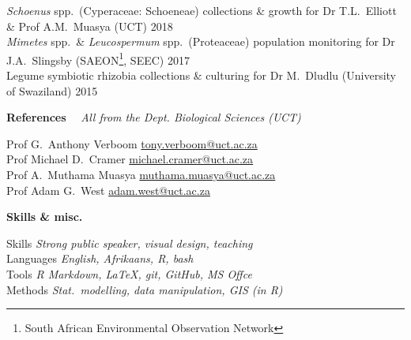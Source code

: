 \documentclass[10pt]{article}
\begin{document}
\textit{Schoenus} spp.~(Cyperaceae: Schoeneae)
  collections \& growth for
  Dr T.L.~Elliott \&
  Prof A.M.~Muasya {\small (UCT)}                                  \hfill {\small 2018} \\
\textit{Mimetes} spp.~\&
  \textit{Leucospermum} spp.~(Proteaceae) population
  monitoring for Dr J.A.~Slingsby
  {\small (SAEON\footnote{South African Environmental
  Observation Network}, SEEC)}                           \hfill {\small 2017} \\
Legume symbiotic rhizobia collections \& culturing for
  Dr M.~Dludlu {\small (University of Swaziland)}        \hfill {\small 2015}

\begin{multicols}{2}

\textbf{References} %
  ~~{\small \textmd{\textit{All from the Dept. Biological Sciences (UCT)}}}

Prof G.~Anthony Verboom
      \hfill     \href{mailto:tony.verboom@uct.ac.za}{tony.verboom@uct.ac.za} \\
Prof Michael D.~Cramer
      \hfill \href{mailto:michael.cramer@uct.ac.za}{michael.cramer@uct.ac.za} \\
Prof A.~Muthama Muasya
      \hfill \href{mailto:muthama.muasya@uct.ac.za}{muthama.muasya@uct.ac.za} \\
Prof Adam G.~West
      \hfill           \href{mailto:adam.west@uct.ac.za}{adam.west@uct.ac.za}

\columnbreak

\textbf{Skills \& misc.} %


Skills         \hfill \textit{Strong public speaker, visual design, teaching} \\
Languages      \hfill \textit{                   English, Afrikaans, R, bash} \\
Tools          \hfill \textit{      R Markdown, LaTeX, git, GitHub, MS Offce} \\
Methods        \hfill \textit{Stat.~modelling, data manipulation, GIS (in R)}

\end{multicols}
\end{document}
